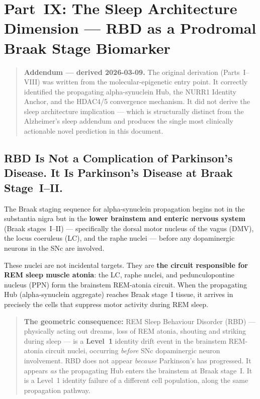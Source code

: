 \documentclass[12pt,a4paper]{article}
\newcommand{\Lev}[1]{\textbf{Level~#1}}
\begin{document}
\section{Part~IX: The Sleep Architecture Dimension ---
RBD as a Prodromal Braak Stage Biomarker}
\label{sec:sleep_pd}

\begin{quote}
\textbf{Addendum --- derived 2026-03-09.} The original derivation
(Parts~I--VIII) was written from the molecular-epigenetic entry point.
It correctly identified the propagating alpha-synuclein Hub, the NURR1
Identity Anchor, and the HDAC4/5 convergence mechanism. It did not derive
the sleep architecture implication --- which is structurally distinct from
the Alzheimer's sleep addendum and produces the single most clinically
actionable novel prediction in this document.
\end{quote}

\subsection{RBD Is Not a Complication of Parkinson's Disease.
It Is Parkinson's Disease at Braak Stage~I--II.}

The Braak staging sequence for alpha-synuclein propagation begins not in
the substantia nigra but in the \textbf{lower brainstem and enteric nervous
system} (Braak stages~I--II) --- specifically the dorsal motor nucleus of
the vagus (DMV), the locus coeruleus (LC), and the raphe nuclei --- before
any dopaminergic neurons in the SNc are involved.

These nuclei are not incidental targets. They are \textbf{the circuit
responsible for REM sleep muscle atonia}: the LC, raphe nuclei, and
pedunculopontine nucleus (PPN) form the brainstem REM-atonia circuit.
When the propagating Hub (alpha-synuclein aggregate) reaches Braak stage~I
tissue, it arrives in precisely the cells that suppress motor activity
during REM sleep.

\begin{quote}
\textbf{The geometric consequence:} REM Sleep Behaviour Disorder (RBD) ---
physically acting out dreams, loss of REM atonia, shouting and striking
during sleep --- is a \Lev{1} identity drift event in the brainstem
REM-atonia circuit nuclei, occurring \emph{before} SNc dopaminergic
neuron involvement. RBD does not appear \emph{because} Parkinson's has
progressed. It appears \emph{as} the propagating Hub enters the brainstem
at Braak stage~I. It is a Level~1 identity failure of a different cell
population, along the same propagation pathway.
\end{quote}
\end{document}
